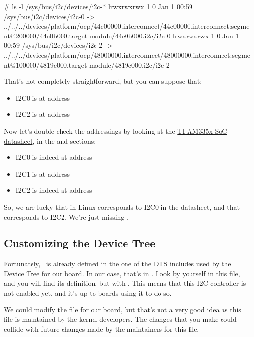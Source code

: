 {\begin{bashinput}
# ls -l /sys/bus/i2c/devices/i2c-*
lrwxrwxrwx    1         0 Jan  1 00:59 /sys/bus/i2c/devices/i2c-0 -> ../../../devices/platform/ocp/44c00000.interconnect/44c00000.interconnect:segment@200000/44e0b000.target-module/44e0b000.i2c/i2c-0
lrwxrwxrwx    1         0 Jan  1 00:59 /sys/bus/i2c/devices/i2c-2 -> ../../../devices/platform/ocp/48000000.interconnect/48000000.interconnect:segment@100000/4819c000.target-module/4819c000.i2c/i2c-2
\end{bashinput}

That's not completely straightforward, but you can suppose that:
\begin{itemize}
\item I2C0 is at address 
\item I2C2 is at address 
\end{itemize}

Now let's double check the addressings by looking at the
\href{https://www.ti.com/lit/ug/spruh73q/spruh73q.pdf}{TI AM335x SoC
datasheet}, in the  and  sections:

\begin{itemize}
\item I2C0 is indeed at address 
\item I2C1 is at address 
\item I2C2 is indeed at address 
\end{itemize}

So, we are lucky that  in Linux corresponds to I2C0 in the
datasheet, and that  corresponds to I2C2.
We're just missing .

\subsection{Customizing the Device Tree}

Fortunately, \busname\ is already defined in the one of the DTS includes
used by the Device Tree for our board. In our case, that's in
. Look by yourself in this
file, and you will find its definition, but with . This means that this I2C controller is not enabled yet,
and it's up to boards using it to do so.

We could modify the  file
for our board, but that's not a very good idea as this file is
maintained by the kernel developers. The changes that you make could
collide with future changes made by the maintainers for this file.

}
